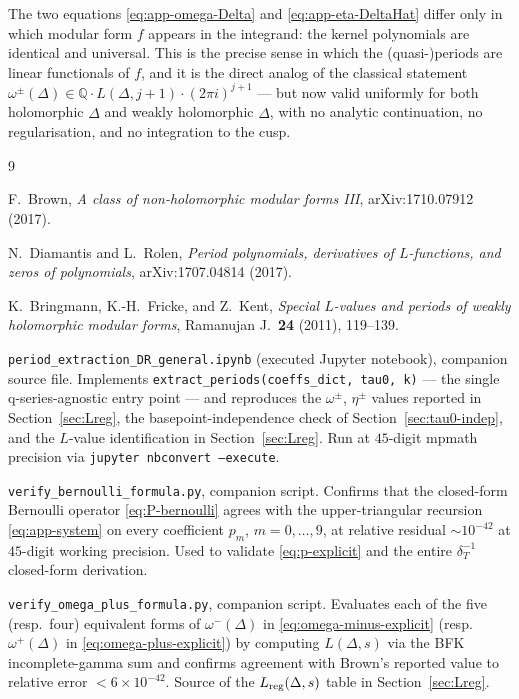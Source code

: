 \documentclass[11pt,letterpaper]{article}
\newcommand{\QQ}{\mathbb{Q}}
\begin{document}
The two equations \eqref{eq:app-omega-Delta} and \eqref{eq:app-eta-DeltaHat}
differ only in which modular form $f$ appears in the integrand: the kernel
polynomials are identical and universal.  This is the precise sense in
which the (quasi-)periods are linear functionals of $f$, and it is the
direct analog of the classical statement
$\omega^\pm(\Delta) \in \QQ\cdot L(\Delta, j+1)\cdot(2\pi i)^{j+1}$ ---
but now valid uniformly for both holomorphic $\Delta$ and weakly
holomorphic $\widehat\Delta$, with no analytic continuation, no
regularisation, and no integration to the cusp.

\begin{thebibliography}{9}

F.\ Brown,
\emph{A class of non-holomorphic modular forms III},
arXiv:1710.07912 (2017).

N.\ Diamantis and L.\ Rolen,
\emph{Period polynomials, derivatives of $L$-functions, and zeros of polynomials},
arXiv:1707.04814 (2017).

K.\ Bringmann, K.-H.\ Fricke, and Z.\ Kent,
\emph{Special $L$-values and periods of weakly holomorphic modular forms},
Ramanujan J.\ \textbf{24} (2011), 119--139.

\texttt{period\_extraction\_DR\_general.ipynb} (executed Jupyter notebook),
companion source file.  Implements \texttt{extract\_periods(coeffs\_dict, tau0, k)}
--- the single q-series-agnostic entry point --- and reproduces the
$\omega^\pm$, $\eta^\pm$ values reported in Section~\ref{sec:Lreg}, the
basepoint-independence check of Section~\ref{sec:tau0-indep}, and the
$L$-value identification in Section~\ref{sec:Lreg}.  Run at $45$-digit
mpmath precision via \texttt{jupyter nbconvert --execute}.

\texttt{verify\_bernoulli\_formula.py}, companion script.  Confirms that the
closed-form Bernoulli operator \eqref{eq:P-bernoulli} agrees with the
upper-triangular recursion \eqref{eq:app-system} on every coefficient $p_m$,
$m = 0, \ldots, 9$, at relative residual $\sim 10^{-42}$ at $45$-digit
working precision.  Used to validate \eqref{eq:p-explicit} and the entire
$\delta_T^{-1}$ closed-form derivation.

\texttt{verify\_omega\_plus\_formula.py}, companion script.  Evaluates each
of the five (resp.\ four) equivalent forms of $\omega^-(\Delta)$ in
\eqref{eq:omega-minus-explicit} (resp.\ $\omega^+(\Delta)$ in
\eqref{eq:omega-plus-explicit}) by computing $L(\Delta, s)$ via the BFK
incomplete-gamma sum and confirms agreement with Brown's reported value
to relative error $< 6\times 10^{-42}$.  Source of the $L_{\rm reg}(\Delta, s)$
table in Section~\ref{sec:Lreg}.


\end{thebibliography}
\end{document}
